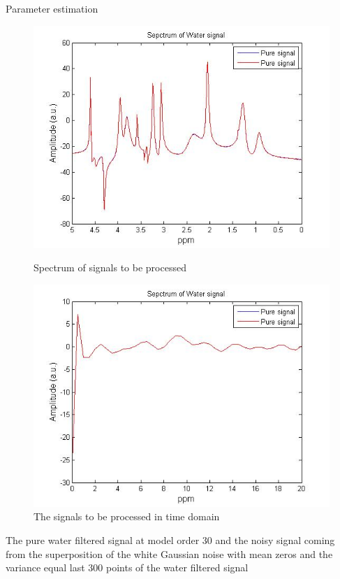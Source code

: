 \documentclass[t,12pt,english
\ifx\beamermode\undefined\else,\beamermode\fi
]{beamer}
\begin{document}
\begin{frame}{Parameter estimation}
    
\begin{figure}[!htbp]
%
\centering
\includegraphics[width=1\textwidth]{35.jpg}
\caption{\tiny Spectrum of signals to be processed}
\endminipage\hfill
{}%
\centering
\includegraphics[width=1\textwidth]{36.jpg}
\caption{\tiny The signals to be processed in time domain}
\endminipage\hfill
\centering
\end{figure}

\tiny{The pure water filtered signal at model order 30 and the noisy signal coming from the superposition of the white Gaussian noise with mean zeros and the variance equal last 300 points of the water filtered signal}  

\end{frame}
\end{document}
